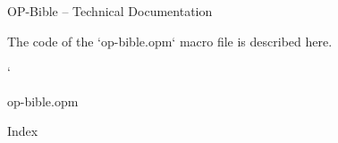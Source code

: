 

\tit OP-Bible -- Technical Documentation

The code of the `op-bible.opm` macro file is described here.

\catcode`

\printdoc op-bible.opm

\sec Index

\makeindex
\endmulti

\bye
